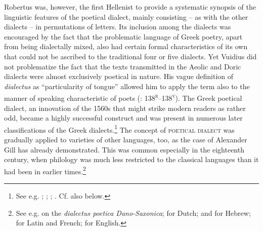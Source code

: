 Robertus \citet[146\textsc{\textsuperscript{v}}–148\textsc{\textsuperscript{v}}]{Vuidius1569} was, however, the first Hellenist to provide a systematic synopsis of the linguistic features of the poetical dialect, mainly consisting – as with the other dialects – in permutations of letters. Its inclusion among the dialects was encouraged by the fact that the problematic language of Greek poetry, apart from being dialectally mixed, also had certain formal characteristics of its own that could not be ascribed to the traditional four or five dialects. Yet Vuidius did not problematize the fact that the texts transmitted in the Aeolic and Doric dialects were almost exclusively poetical in nature. His vague definition of \textit{dialectus} as “particularity of tongue” allowed him to apply the term also to the manner of speaking characteristic of poets (\citealt{Vuidius1569}: 138\textsc{\textsuperscript{r}}–138\textsc{\textsuperscript{v}}). The Greek poetical dialect, an innovation of the 1560s that might strike modern readers as rather odd, became a highly successful construct and was present in numerous later classifications of the Greek dialects.\footnote{See e.g. \citet[\textsc{x}.1\textsc{\textsuperscript{v}}]{Dabercusius1577}; \citet[\textsc{i.1}\textsc{\textsuperscript{v}}]{Camden1595}; \citet[376--377]{Kober1701}; \citet[113]{Petisco1764}. Cf. also  below.} The concept of \textsc{poetical} \textsc{dialect} was gradually applied to varieties of other languages, too, as the case of Alexander Gill has already demonstrated. This was common especially in the eighteenth century, when philology was much less restricted to the classical languages than it had been in earlier times.\footnote{See e.g. \citet[101]{Hickes1705} on the \textit{dialectus poetica Dano-Saxonica}; \citet[*.3\textsc{\textsuperscript{r}}]{Verwer1707} for Dutch; \citet[24]{Wesley1736} and \citet{Vogel1764} for Hebrew; \citet[240, 241]{Beattie1778} for Latin and French; \citet[292]{Macnicol1779} for English.}

